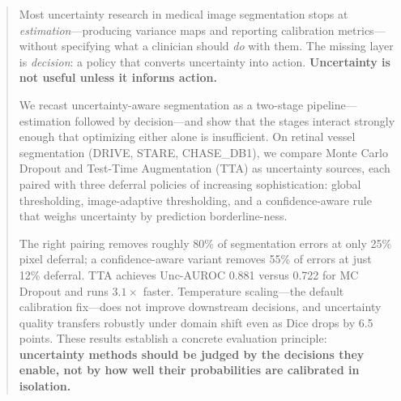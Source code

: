 \begin{abstract}

Most uncertainty research in medical image segmentation stops at
\emph{estimation}---producing variance maps and reporting calibration
metrics---without specifying what a clinician should \emph{do} with them.
The missing layer is \emph{decision}: a policy that converts uncertainty
into action. \textbf{Uncertainty is not useful unless it informs action.}

We recast uncertainty-aware segmentation as a two-stage pipeline---estimation
followed by decision---and show that the stages interact strongly enough
that optimizing either alone is insufficient. On retinal vessel segmentation
(DRIVE, STARE, CHASE\_DB1), we compare Monte Carlo Dropout and Test-Time
Augmentation (TTA) as uncertainty sources, each paired with three deferral
policies of increasing sophistication: global thresholding, image-adaptive
thresholding, and a confidence-aware rule that weighs uncertainty by
prediction borderline-ness.

The right pairing removes roughly 80\% of segmentation errors at only
25\% pixel deferral; a confidence-aware variant removes 55\% of errors at
just 12\% deferral. TTA achieves Unc-AUROC 0.881 versus 0.722 for MC
Dropout and runs $3.1\times$ faster. Temperature scaling---the default
calibration fix---does not improve downstream decisions, and uncertainty
quality transfers robustly under domain shift even as Dice drops by 6.5
points. These results establish a concrete evaluation principle:
\textbf{uncertainty methods should be judged by the decisions they enable,
not by how well their probabilities are calibrated in isolation.}

\end{abstract}
